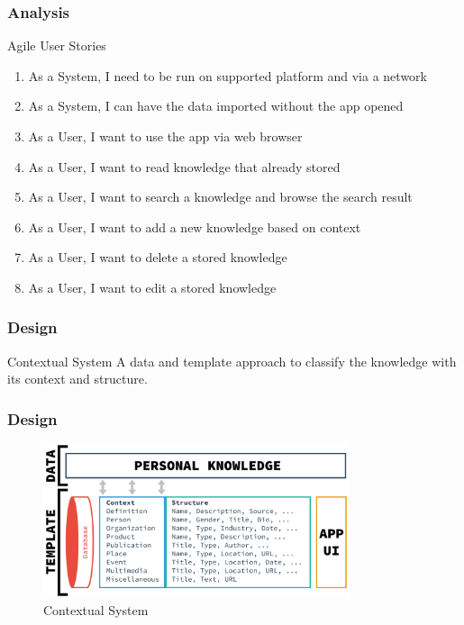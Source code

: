 \documentclass[10pt, compress]{beamer}
\begin{document}

\begin{frame}[fragile]
  \frametitle{Analysis}

  Agile User Stories
  \begin{enumerate} \itemsep0pt
    \item As a System, I need to be run on supported platform and via a network
    \item As a System, I can have the data imported without the app opened
    \item As a User, I want to use the app via web browser
    \item As a User, I want to read knowledge that already stored
    \item As a User, I want to search a knowledge and browse the search result
    \item As a User, I want to add a new knowledge based on context
    \item As a User, I want to delete a stored knowledge
    \item As a User, I want to edit a stored knowledge
  \end{enumerate}

\end{frame}


\begin{frame}[fragile]
  \frametitle{Design}

  \begin{block}{Contextual System}
    A data and template approach to classify the knowledge with its context and structure.
  \end{block}

\end{frame}


\begin{frame}[fragile]
  \frametitle{Design}

  \begin{figure}[ht]
    \centering
    \includegraphics[width=9cm]{include/satellid-contextual.png}
    \caption{Contextual System}
    \label{fig:satellid-contextual}
  \end{figure}

\end{frame}
\end{document}
